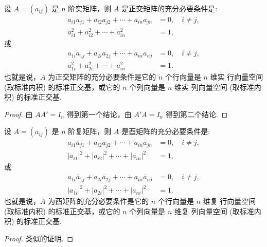 \documentclass[../../main.tex]{subfiles}%
\begin{document}
\begin{theorem}\label{theorem:正交矩阵的基本性质1}
设 $A = (a_{ij})$ 是 $n$ 阶实矩阵，则 $A$ 是正交矩阵的充分必要条件是:
\begin{align*}
a_{i1}a_{j1} + a_{i2}a_{j2} + \cdots + a_{in}a_{jn} &= 0,\quad i \neq j,\\
a_{i1}^2 + a_{i2}^2 + \cdots + a_{in}^2 &= 1,
\end{align*}
或
\begin{align*}
a_{1i}a_{1j} + a_{2i}a_{2j} + \cdots + a_{ni}a_{nj} &= 0,\quad i \neq j,\\
a_{1i}^2 + a_{2i}^2 + \cdots + a_{ni}^2 &= 1.
\end{align*}
也就是说，$A$ 为正交矩阵的充分必要条件是它的 $n$ 个行向量是 $n$ 维实 行向量空间 (取标准内积) 的标准正交基，或它的 $n$ 个列向量是 $n$ 维实 列向量空间 (取标准内积) 的标准正交基.
\end{theorem}
\begin{proof}
由 $AA' = I_n$ 得到第一个结论，由 $A'A = I_n$ 得到第二个结论.
\end{proof}

\begin{theorem}\label{theorem:酉矩阵的基本性质1}
设 $A = (a_{ij})$ 是 $n$ 阶复矩阵，则 $A$ 是酉矩阵的充分必要条件是:
\begin{align*}
a_{i1}\overline{a}_{j1} + a_{i2}\overline{a}_{j2} + \cdots + a_{in}\overline{a}_{jn} &= 0,\quad i \neq j,\\
|a_{i1}|^2 + |a_{i2}|^2 + \cdots + |a_{in}|^2 &= 1,
\end{align*}
或
\begin{align*}
a_{1i}\overline{a}_{1j} + a_{2i}\overline{a}_{2j} + \cdots + a_{ni}\overline{a}_{nj} &= 0,\quad i \neq j,\\
|a_{1i}|^2 + |a_{2i}|^2 + \cdots + |a_{ni}|^2 &= 1.
\end{align*}
也就是说，$A$ 为酉矩阵的充分必要条件是它的 $n$ 个行向量是 $n$ 维复 行向量空间 (取标准内积) 的标准正交基，或它的 $n$ 个列向量是 $n$ 维复 列向量空间 (取标准内积) 的标准正交基.
\end{theorem}
\begin{proof}
类似的证明.
\end{proof}
\end{document}
